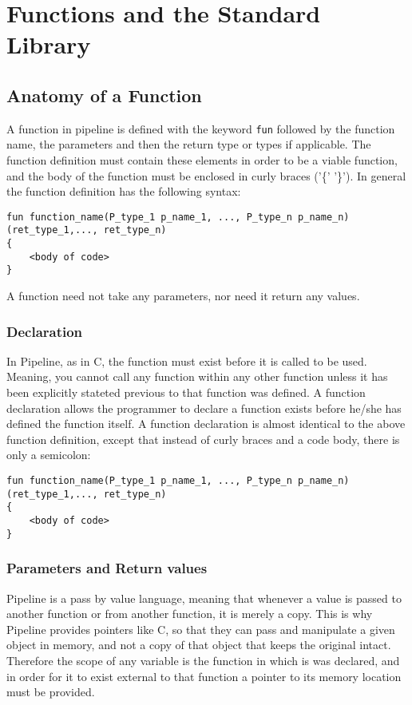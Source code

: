 \documentclass[./LRM_main.tex]{subfiles}
\begin{document}


\chapter{Functions and the Standard Library}
\section{Anatomy of a Function}
A function in pipeline is defined with the keyword \texttt{fun} followed by the function name, the parameters and then the return type or types if applicable. The function definition must contain these elements in order to be a viable function, and the body of the function must be enclosed in curly braces ('\{' '\}'). In general the function definition has the following syntax:
\begin{lstlisting}
fun function_name(P_type_1 p_name_1, ..., P_type_n p_name_n)(ret_type_1,..., ret_type_n)
{
	<body of code>
}
\end{lstlisting}
A function need not take any parameters, nor need it return any values.
\subsection{Declaration}
In Pipeline, as in C, the function must exist before it is called to be used. Meaning, you cannot call any function within any other function unless it has been explicitly stateted previous to that function was defined. A function declaration allows the programmer to declare a function exists before he/she has defined the function itself. A function declaration is almost identical to the above function definition, except that instead of curly braces and a code body, there is only a semicolon:
\begin{lstlisting}
fun function_name(P_type_1 p_name_1, ..., P_type_n p_name_n)(ret_type_1,..., ret_type_n)
{
	<body of code>
}
\end{lstlisting}
\subsection{Parameters and Return values}
Pipeline is a pass by value language, meaning that whenever a value is passed to another function or from another function, it is merely a copy. This is why Pipeline provides pointers like C, so that they can pass and manipulate a given object in memory, and not a copy of that object that keeps the original intact. Therefore the scope of any variable is the function in which is was declared, and in order for it to exist external to that function a pointer to its memory location must be provided.
\end{document}
